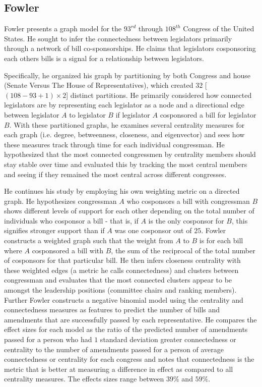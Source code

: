\subsection{Fowler}

Fowler presents a graph model for the $93^{rd}$ through $108^{th}$ Congress of the United 
States. He sought to infer the connectedness between legislators primarily 
through a network of bill co-sponsorships. He claims that legislators 
cosponsoring each others bills is a signal for a relationship between legislators.

Specifically, he organized his graph by partitioning by both Congress and house 
(Senate Versus The House of Representatives), which created $32$ 
[$(108 - 93 + 1) \times 2$] distinct partitions. He primarily considered how 
connected legislators are by representing each legislator as a node and a 
directional edge between legislator $A$ to legislator $B$ if legislator $A$ 
cosponsored a bill for legislator $B$. With these partitioned graphs, he 
examines several centrality measures for each graph (i.e. degree, betweenness, 
closeness, and eigenvector) and sees how these measures track through time for 
each individual congressman. He hypothesized that the most connected 
congressmen by centrality members should stay stable over time and evaluated 
this by tracking the most central members and seeing if they remained the 
most central across different congresses.

He continues his study by employing his own weighting metric on a directed 
graph. He hypothesizes congressman $A$ who cosponsors a bill with congressman 
$B$ shows different levels of support for each other depending on the total 
number of individuals who cosponsor a bill - that is, if $A$ is the only 
cosponsor for $B$, this signifies stronger support than if $A$ was one 
cosponsor out of $25$. Fowler constructs a weighted graph such that the weight 
from $A$ to $B$ is for each bill where $A$ cosponsored a bill with $B$, the 
sum of the reciprocal of the total number of cosponsors for that particular 
bill. He then infers closeness centrality with these weighted edges (a metric 
he calls connectedness) and clusters between congressman and evaluates that the 
most connected clusters appear to be amongst the leadership positions 
(committee chairs and ranking members). Further Fowler constructs a negative 
binomial model using the centrality and connectedness measures as features to 
predict the number of bills and amendments that are successfully passed by each 
representative. He compares the effect sizes for each model as the ratio of the 
predicted number of amendments passed for a person who had $1$ standard 
deviation greater connectedness or centrality to the  number of amendments 
passed for a person of average connectedness or centrality for each congress 
and notes that connectedness is the metric that is better at measuring a 
difference in effect as compared to all centrality measures. The effects sizes 
range between $39\%$ and $59\%$.

